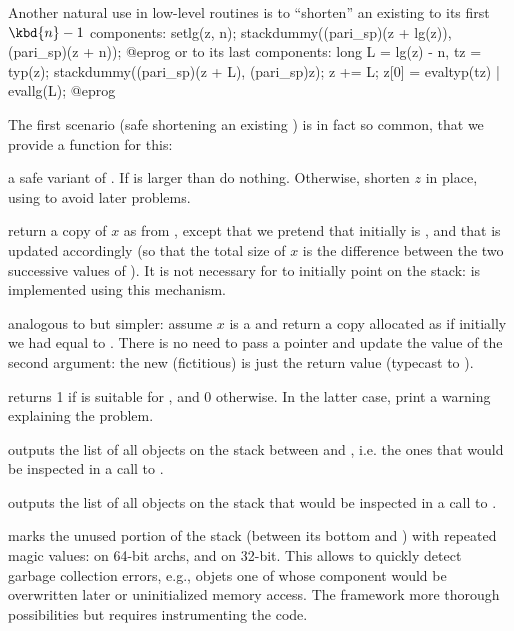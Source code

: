 Another natural use in low-level routines is to ``shorten'' an existing
  to its first $\kbd{n}-1$ components:
\bprog
  setlg(z, n);
  stackdummy((pari_sp)(z + lg(z)), (pari_sp)(z + n));
@eprog\noindent
or to its last  components:
\bprog
  long L = lg(z) - n, tz = typ(z);
  stackdummy((pari_sp)(z + L), (pari_sp)z);
  z += L; z[0] = evaltyp(tz) | evallg(L);
@eprog

The first scenario (safe shortening an existing ) is in fact so
common, that we provide a function for this:

 a safe variant of . If
 is larger than  do nothing. Otherwise, shorten $z$ in
place, using  to avoid later  problems.

 return a copy of $x$ as from
, except that we pretend that initially  is ,
and that  is updated accordingly (so that the total size of $x$ is
the difference between the two successive values of ). It is not
necessary for  to initially point on the stack:  is
implemented using this mechanism.

 analogous to  but
simpler: assume $x$ is a  and return a copy allocated as if
initially we had  equal to . There is no need to pass a
pointer and update the value of the second argument: the new (fictitious)
 is just the return value (typecast to ).


 returns 1 if  is suitable for
, and 0 otherwise. In the latter case, print a warning
explaining the problem.

 outputs the list of all objects on the
stack between  and , i.e. the ones that would be inspected
in a call to .

 outputs the list of all objects on the
stack that would be inspected in a call to .

 marks the unused portion of the stack
(between its bottom and ) with repeated magic values:
 on 64-bit archs, and  on 32-bit.
This allows to quickly detect garbage collection errors, e.g., objets one of
whose component would be overwritten later or uninitialized memory access.
The  framework more thorough possibilities but requires
instrumenting the code.


